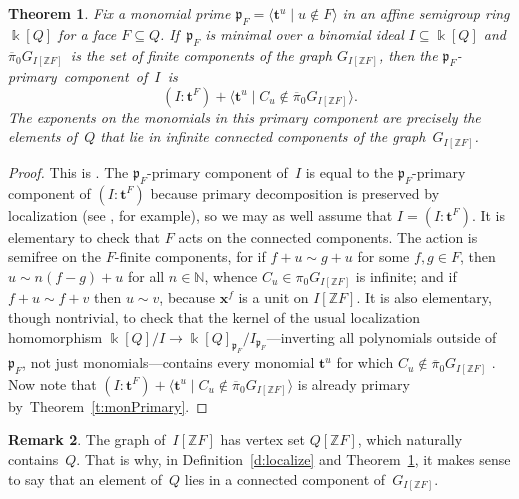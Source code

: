 \documentclass[12pt]{amsart}
\numberwithin{equation}{section}
\newtheorem{thm}{Theorem}[section]
\theoremstyle{definition}
\newtheorem{remark}[thm]{Remark}
\begin{document}
\begin{thm}\label{t:monAss}
Fix a monomial prime ${\mathfrak{p}}_F = {\langle}{\mathbf{t}}^u \mid u \notin F{\rangle}$ in an affine
semigroup ring ${\Bbbk}[Q]$ for a face $F \subseteq Q$.  If\/~${\mathfrak{p}}_F$ is
minimal over a binomial ideal $I \subseteq {\Bbbk}[Q]$ and ${{\overline{\pi}}{}}_0
G_{I[{\mathbb{Z}} F]}$~is the set of finite
components of the graph $G_{I[{\mathbb{Z}} F]}$, then the
${\mathfrak{p}}_F$-primary~component~of~$I$~is
$$  (I:{\mathbf{t}}^F) + {\langle}{\mathbf{t}}^u \mid C_u \notin {{\overline{\pi}}{}}_0 G_{I[{\mathbb{Z}} F]}{\rangle}.
$$
The exponents on the monomials in this primary component are precisely
the elements of~$Q$ that lie in infinite connected components of the
graph~$G_{I[{\mathbb{Z}} F]}$.
\end{thm}
\begin{proof}
This is \cite[Theorem~2.15]{primDecomp}.  The ${\mathfrak{p}}_F$-primary
component of~$I$ is equal to the ${\mathfrak{p}}_F$-primary component of
$(I:{\mathbf{t}}^F)$ because primary decomposition is preserved by
localization (see
\cite[Proposition~4.9]{AM}, for example), so we may as well assume
that $I = (I:{\mathbf{t}}^F)$.
It is elementary to check that $F$ acts on the connected components.
The action is semifree on the $F$-finite components, for if $f + u
\sim g + u$ for some $f,g \in F$, then $u \sim n(f-g) + u$ for all $n
\in {\mathbb{N}}$, whence $C_u \in \pi_0 G_{I[{\mathbb{Z}} F]}$ is infinite; and if $f +
u \sim f + v$ then $u \sim v$, because ${\mathbf{x}}^f$ is a unit on $I[{\mathbb{Z}}
F]$.  It is also elementary, though nontrivial, to check that the
kernel of the usual localization homomorphism ${\Bbbk}[Q]/I \to
{\Bbbk}[Q]_{{\mathfrak{p}}_F}/I_{{\mathfrak{p}}_F}$---inverting all polynomials outside
of~${\mathfrak{p}}_F$, not just monomials---contains every monomial ${\mathbf{t}}^u$ for
which $C_u \notin {{\overline{\pi}}{}}_0 G_{I[{\mathbb{Z}} F]}$ \cite[Lemmas~2.9
and~2.10]{primDecomp}.  Now note that $(I:{\mathbf{t}}^F) + {\langle}{\mathbf{t}}^u \mid C_u
\notin {{\overline{\pi}}{}}_0 G_{I[{\mathbb{Z}} F]}{\rangle}$ is already
primary by~Theorem~\ref{t:monPrimary}.
\end{proof}

\begin{remark}
The graph of~$I[{\mathbb{Z}} F]$ has vertex set $Q[{\mathbb{Z}} F]$, which naturally
contains~$Q$.  That is why, in Definition~\ref{d:localize} and
Theorem~\ref{t:monAss}, it makes sense to say that an element of~$Q$
lies in a connected component of~$G_{I[{\mathbb{Z}} F]}$.
\end{remark}
\end{document}
